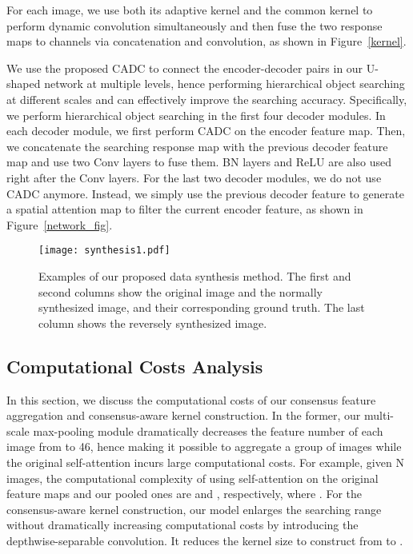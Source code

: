 \documentclass[10pt,twocolumn,letterpaper]{article}
\begin{document}
For each image, we use both its adaptive kernel and the common kernel to perform dynamic convolution simultaneously and then fuse the two response maps to  channels via concatenation and convolution, as shown in Figure~\ref{kernel}.

We use the proposed CADC to connect the encoder-decoder pairs in our U-shaped network at multiple levels, hence performing hierarchical object searching at different scales and can effectively improve the searching accuracy.
Specifically, we perform hierarchical object searching in the first four decoder modules.
In each decoder module, we first perform CADC on the encoder feature map. Then, we concatenate the searching response map with the previous decoder feature map and use two  Conv layers to fuse them. 
BN \cite{ioffe2015bn} layers and ReLU are also used right after the Conv layers.
For the last two decoder modules, we do not use CADC anymore. Instead, we simply use the previous decoder feature to generate a spatial attention map to filter the current encoder feature, as shown in Figure~\ref{network_fig}.

\begin{figure}[!t]
  \graphicspath{{Figures/synthesis_strategy/}}
  \centering
  \texttt{[image: synthesis1.pdf]}
  \caption{Examples of our proposed data synthesis method. The first and second columns show the original image and the normally synthesized image, and their corresponding ground truth. The last column shows the reversely synthesized image.}
  \label{synthesis}
  \vspace{-0.3cm}
\end{figure}


\subsection{Computational Costs Analysis}
In this section, we discuss the computational costs of our consensus feature aggregation and consensus-aware kernel construction.
In the former, our multi-scale max-pooling module dramatically decreases the feature number of each image from  to 46, hence making it possible to aggregate a group of images while the original self-attention incurs large computational costs.
For example, given N images, the computational complexity of using self-attention on the original feature maps and our pooled ones are  and , respectively, where .
For the consensus-aware kernel construction, our model enlarges the searching range without dramatically increasing computational costs by introducing the depthwise-separable convolution.
It reduces the kernel size to construct from  to .
\end{document}
